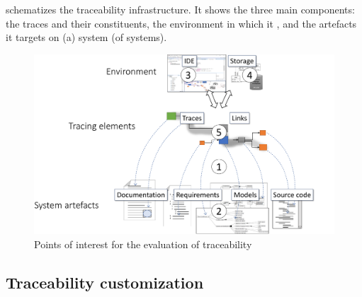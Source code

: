 
 schematizes the traceability infrastructure. It shows the three main components: the traces and their constituents, the environment in which it , and the artefacts it targets on (a) system (of systems). 
 
\begin{figure}[h]  
	\centering
	\includegraphics[width=.85\linewidth]{images/evaluation-points.pdf}
	\caption{Points of interest for the evaluation of traceability}
	\label{fig:evaluationpoints}
\end{figure}



\subsection{Traceability customization}\label{sec:custom}

